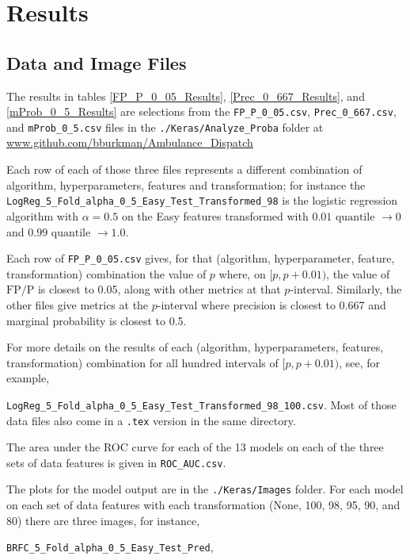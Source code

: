 \section{Results}\label{Results}

\subsection{Data and Image Files}
\label{data_files}

The results in tables \ref{FP_P_0_05_Results}, \ref{Prec_0_667_Results}, and \ref{mProb_0_5_Results} are selections from the 
\verb|FP_P_0_05.csv|, 
\verb|Prec_0_667.csv|, and
\verb|mProb_0_5.csv| files in the 
\verb|./Keras/Analyze_Proba| folder at
\url{www.github.com/bburkman/Ambulance_Dispatch}

Each row of each of those three files represents a different combination of algorithm, hyperparameters, features and transformation; for instance the 
\verb|LogReg_5_Fold_alpha_0_5_Easy_Test_Transformed_98| is the logistic regression algorithm with $\alpha = 0.5$ on the Easy features transformed with $0.01 \text{ quantile } \to 0$ and $0.99 \text{ quantile } \to 1.0$.  

Each row of \verb|FP_P_0_05.csv| gives, for that (algorithm, hyperparameter, feature, transformation) combination the value of $p$ where, on $[p, p+0.01)$, the value of $\text{FP}/\text{P}$ is closest to 0.05, along with other metrics at that $p$-interval.  Similarly, the other files give metrics at the $p$-interval where precision is closest to 0.667 and marginal probability is closest to 0.5.  

For more details on the results of each (algorithm, hyperparameters, features, transformation) combination for all hundred intervals of $[p, p+0.01)$, see, for example, 

\noindent\verb|LogReg_5_Fold_alpha_0_5_Easy_Test_Transformed_98_100.csv|.  Most of those data files also come in a \verb|.tex| version in the same directory.  

The area under the ROC curve for each of the 13 models on each of the three sets of data features is given in \verb|ROC_AUC.csv|.

The plots for the model output are in the \verb|./Keras/Images| folder.  For each model on each set of data features with each transformation (None, 100, 98, 95, 90, and 80) there are three images, for instance, 

\verb|BRFC_5_Fold_alpha_0_5_Easy_Test_Pred|,

